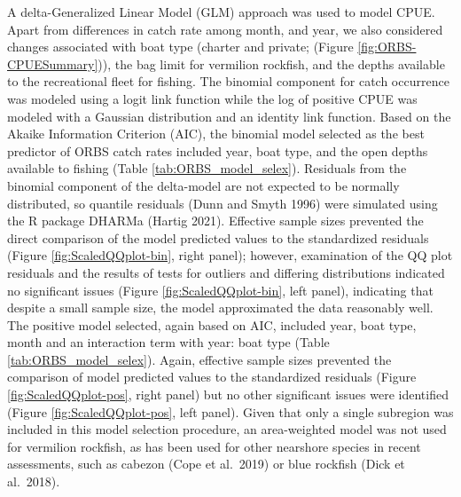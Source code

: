 \documentclass[11pt,
  english,
  a4paper,
]{article}
\begin{document}
A delta-Generalized Linear Model (GLM) approach was used to model CPUE. Apart from differences in catch rate among month, and year, we also considered changes associated with boat type (charter and private; (Figure \ref{fig:ORBS-CPUESummary})), the bag limit for vermilion rockfish, and the depths available to the recreational fleet for fishing. The binomial component for catch occurrence was modeled using a logit link function while the log of positive CPUE was modeled with a Gaussian distribution and an identity link function. Based on the Akaike Information Criterion (AIC), the binomial model selected as the best predictor of ORBS catch rates included year, boat type, and the open depths available to fishing (Table \ref{tab:ORBS_model_selex}). Residuals from the binomial component of the delta-model are not expected to be normally distributed, so quantile residuals (Dunn and Smyth 1996) were simulated using the R package DHARMa (Hartig 2021). Effective sample sizes prevented the direct comparison of the model predicted values to the standardized residuals (Figure \ref{fig:ScaledQQplot-bin}, right panel); however, examination of the QQ plot residuals and the results of tests for outliers and differing distributions indicated no significant issues (Figure \ref{fig:ScaledQQplot-bin}, left panel), indicating that despite a small sample size, the model approximated the data reasonably well. The positive model selected, again based on AIC, included year, boat type, month and an interaction term with year: boat type (Table \ref{tab:ORBS_model_selex}). Again, effective sample sizes prevented the comparison of model predicted values to the standardized residuals (Figure \ref{fig:ScaledQQplot-pos}, right panel) but no other significant issues were identified (Figure \ref{fig:ScaledQQplot-pos}, left panel). Given that only a single subregion was included in this model selection procedure, an area-weighted model was not used for vermilion rockfish, as has been used for other nearshore species in recent assessments, such as cabezon (Cope et al.~2019) or blue rockfish (Dick et al.~2018).

\leavevmode\tagmcend\tagstructend\par

\end{document}
